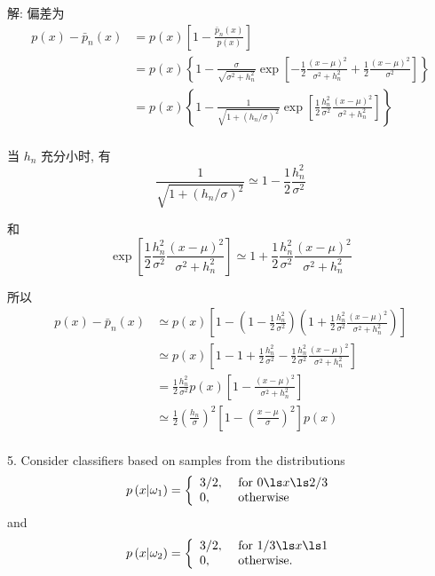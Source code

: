 \documentclass[openany]{ctexbook}
\theoremstyle{kaiti}
\theoremstyle{normal}
\begin{document}
解: 偏差为
\begin{equation}
  \begin{aligned}
    p(x)-\bar{p}_n(x)
    &=p(x)\left[1-\frac{\bar{p}_n(x)}{p(x)}\right]\\
    &=p(x)\left\{1-\frac{\sigma}{\sqrt{\sigma^2+h_n^2}}\exp\left[-\frac{1}{2}\frac{(x-\mu)^2}{\sigma^2+h_n^2}+\frac{1}{2}\frac{(x-\mu)^2}{\sigma^2}\right]\right\}\\
    &=p(x)\left\{1-\frac{1}{\sqrt{1+(h_n/\sigma)^2}}\exp\left[\frac{1}{2}\frac{h_n^2}{\sigma^2}\frac{(x-\mu)^2}{\sigma^2+h_n^2}\right]\right\}\\
  \end{aligned}
\end{equation}

当 $h_n$ 充分小时, 有
\begin{equation}
  \frac{1}{\sqrt{1+(h_n/\sigma)^2}}\simeq 1-\frac{1}{2}\frac{h_n^2}{\sigma^2}
\end{equation}

和
\begin{equation}
  \exp\left[\frac{1}{2}\frac{h_n^2}{\sigma^2}\frac{(x-\mu)^2}{\sigma^2+h_n^2}\right]\simeq 1+\frac{1}{2}\frac{h_n^2}{\sigma^2}\frac{(x-\mu)^2}{\sigma^2+h_n^2}
\end{equation}

所以
\begin{equation}
  \begin{aligned}
    p(x)-\bar{p}_n(x)
    &\simeq p(x)\left[1-\left(1-\frac{1}{2}\frac{h_n^2}{\sigma^2}\right)\left(1+\frac{1}{2}\frac{h_n^2}{\sigma^2}\frac{(x-\mu)^2}{\sigma^2+h_n^2}\right)\right]\\
    &\simeq p(x)\left[1-1+\frac{1}{2}\frac{h_n^2}{\sigma^2}-\frac{1}{2}\frac{h_n^2}{\sigma^2}\frac{(x-\mu)^2}{\sigma^2+h_n^2}\right]\\
    &=\frac{1}{2}\frac{h_n^2}{\sigma^2}p(x)\left[1-\frac{(x-\mu)^2}{\sigma^2+h_n^2}\right]\\
    &\simeq \frac{1}{2}\left(\frac{h_{n}}{\sigma}\right)^{2}\left[1-\left(\frac{x-\mu}{\sigma}\right)^{2}\right] p(x)\\
  \end{aligned}
\end{equation}

5. Consider classifiers based on samples from the distributions
\begin{equation}
  p\left(x|\omega_{1}\right)=
  \left\{
    \begin{array}{ll}
      3 / 2, & \text { for } 0 \ls x \ls 2 / 3 \\
      0,     & \text { otherwise }
    \end{array}
  \right.
\end{equation}
and
\begin{equation}
  p\left(x|\omega_{2}\right)=
  \left\{
    \begin{array}{ll}
      3 / 2, & \text { for } 1 / 3 \ls x \ls 1 \\
      0,     & \text { otherwise. }
    \end{array}
  \right.
\end{equation}
\end{document}
